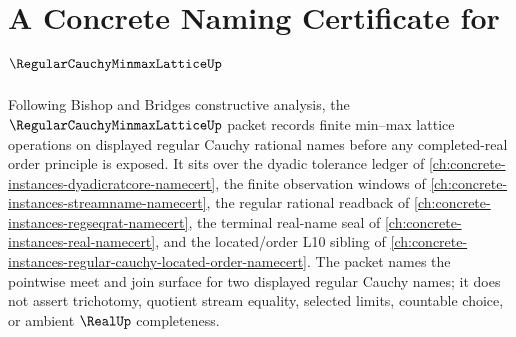 \chapter{A Concrete Naming Certificate for $\RegularCauchyMinmaxLatticeUp$}
\label{ch:concrete-instances-regular-cauchy-minmax-lattice-namecert}

Following Bishop and Bridges constructive analysis, the $\RegularCauchyMinmaxLatticeUp$ packet records finite min--max lattice operations on displayed regular Cauchy rational names before any completed-real order principle is exposed. It sits over the dyadic tolerance ledger of \autoref{ch:concrete-instances-dyadicratcore-namecert}, the finite observation windows of \autoref{ch:concrete-instances-streamname-namecert}, the regular rational readback of \autoref{ch:concrete-instances-regseqrat-namecert}, the terminal real-name seal of \autoref{ch:concrete-instances-real-namecert}, and the located/order L10 sibling of \autoref{ch:concrete-instances-regular-cauchy-located-order-namecert}. The packet names the pointwise meet and join surface for two displayed regular Cauchy names; it does not assert trichotomy, quotient stream equality, selected limits, countable choice, or ambient $\RealUp$ completeness.

